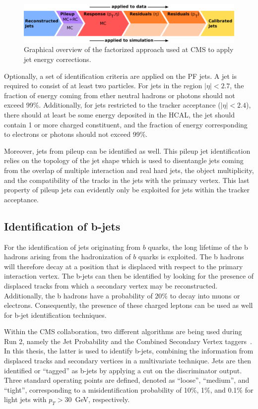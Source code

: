 \begin{figure}[ht]
  \centering
 \includegraphics[width=.85\textwidth]{JEC.pdf} 
 \caption{Graphical overview of the factorized approach used at \ac{CMS} to apply jet energy corrections.}
 \label{fig:JEC}
\end{figure}

Optionally, a set of identification criteria are applied on the \ac{PF} jets. A jet is required to consist of at least two particles. For jets in the region $|\eta| < 2.7$, the fraction of energy coming from ether neutral hadrons or photons should not exceed 99\%. Additionally, for jets restricted to the tracker acceptance ($|\eta| < 2.4$), there should at least be some energy deposited in the \ac{HCAL}, the jet should contain 1 or more charged constituent, and the fraction of energy corresponding to electrons or photons should not exceed 99\%.

Moreover, jets from pileup can be identified as well. This pileup jet identification relies on the topology of the jet shape which is used to disentangle jets coming from the overlap of multiple interaction and real hard jets, the object multiplicity, and the compatibility of the tracks in the jets with the primary vertex. This last property of pileup jets can evidently only be exploited for jets within the tracker acceptance.

\subsection{Identification of b-jets}
\label{sec:btagging}

For the identification of jets originating from $b$ quarks, the long lifetime of the b hadrons arising from the hadronization of $b$ quarks is exploited. The b hadrons will therefore decay at a position that is displaced with respect to the primary interaction vertex. The b-jets can then be identified by looking for the presence of displaced tracks from which a secondary vertex may be reconstructed. Additionally, the b hadrons have a probability of 20\% to decay into muons or electrons. Consequently, the presence of these charged leptons can be used as well for b-jet identification techniques.

Within the \ac{CMS} collaboration, two different algorithms are being used during Run 2, namely the Jet Probability and the Combined Secondary Vertex taggers~\cite{Chatrchyan:2012jua}. In this thesis, the latter is used to identify b-jets, combining the information from displaced tracks and secondary vertices in a multivariate technique. Jets are then identified or ``tagged'' as b-jets by applying a cut on the discriminator output. Three standard operating points are defined, denoted as ``loose'', ``medium'', and ``tight'', corresponding to a misidentification probability of 10\%, 1\%, and 0.1\% for light jets with $p_T > 30$~GeV, respectively.
